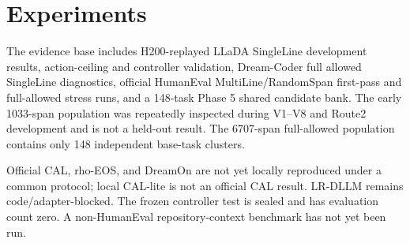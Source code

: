 \section{Experiments}
The evidence base includes H200-replayed LLaDA SingleLine development results, action-ceiling and controller validation, Dream-Coder full allowed SingleLine diagnostics, official HumanEval MultiLine/RandomSpan first-pass and full-allowed stress runs, and a 148-task Phase 5 shared candidate bank. The early 1033-span population was repeatedly inspected during V1--V8 and Route2 development and is not a held-out result. The 6707-span full-allowed population contains only 148 independent base-task clusters.

Official CAL, rho-EOS, and DreamOn are not yet locally reproduced under a common protocol; local CAL-lite is not an official CAL result. LR-DLLM remains code/adapter-blocked. The frozen controller test is sealed and has evaluation count zero. A non-HumanEval repository-context benchmark has not yet been run.
